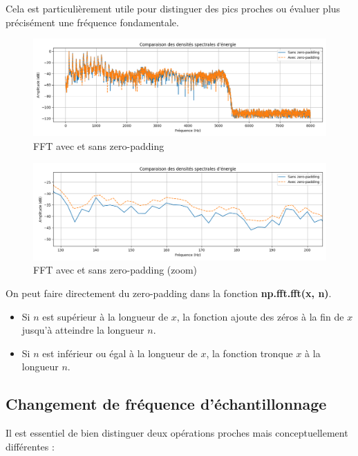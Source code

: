 Cela est particulièrement utile pour distinguer des pics proches ou évaluer plus précisément une fréquence fondamentale.

\begin{figure}[h!]
    \centering
    \includegraphics[width=17cm]{screenshots/fft_avec_zero_padding.png}
    \caption{FFT avec et sans zero-padding}
\end{figure}

\begin{figure}[h!]
    \centering
    \includegraphics[width=17cm]{screenshots/fft_avec_zero_padding_zoom.png}
    \caption{FFT avec et sans zero-padding (zoom)}
    \label{fig:fft_zero_padding_zoom}
\end{figure}

\newpage
On peut faire directement du zero-padding dans la fonction \textbf{np.fft.fft(x, n)}.

\begin{itemize}
    \item Si \( n \) est supérieur à la longueur de \( x \), la fonction ajoute des zéros à la fin de \( x \) jusqu'à atteindre la longueur \( n \).
    \item Si \( n \) est inférieur ou égal à la longueur de \( x \), la fonction tronque \( x \) à la longueur \( n \).
\end{itemize}

\subsection{Changement de fréquence d’échantillonnage}

Il est essentiel de bien distinguer deux opérations proches mais conceptuellement différentes :

